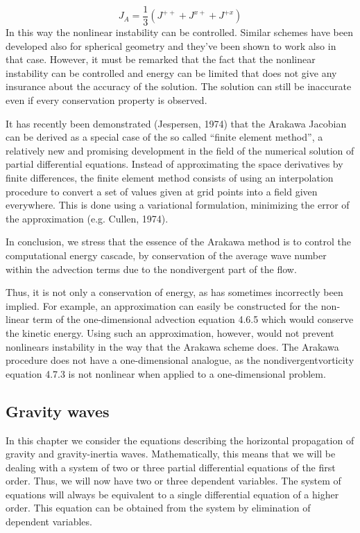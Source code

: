 $$J_A=\frac{1}{3}\left(J^{++}+J^{x+}+ J^{+x}\right)$$
In this way the nonlinear instability can be controlled. Similar schemes have been developed also for spherical geometry and they've been shown to work also in that case. However, it must be remarked that the fact that the nonlinear instability can be controlled and energy can be limited that does not give any insurance about the accuracy of the solution. The solution can still be inaccurate even if every conservation property is observed.


It has recently been demonstrated (Jespersen, 1974) that the Arakawa Jacobian can be derived as a special case of the so called “finite element method”, a relatively new and promising development in the field of the numerical solution of partial differential equations. Instead of approximating the space derivatives by finite differences, the finite element method consists of using an interpolation procedure to convert a set of values given at grid points into a field given everywhere. This is done using a variational formulation, minimizing the error of the approximation (e.g. Cullen, 1974).

In conclusion, we stress that the essence of the Arakawa method is to control the computational energy cascade, by conservation of the average wave number within the advection terms due to the nondivergent part of the flow.

Thus, it is not only a conservation of energy, as has sometimes incorrectly been implied. For example, an approximation can easily be constructed for the non­linear term of the one-dimensional advection equation 4.6.5 which would conserve the kinetic energy. Using such an approximation, however, would not prevent nonlinears instability in the way that the Arakawa scheme does. The Arakawa procedure does not have a one-dimensional analogue, as the nondivergentvorticity equation 4.7.3 is not nonlinear when applied to a one-dimensional problem.


\subsection{Gravity waves}
In this chapter we consider the equations describing the horizontal propagation of gravity and gravity-inertia waves. Mathematically, this means that we will be dealing with a system of two or three partial differential equations of the first order. Thus, we will now have two or three dependent variables. The system of equations will always be equivalent to a single differential equation of a higher order. This equation can be obtained from the system by elimination of dependent variables.

